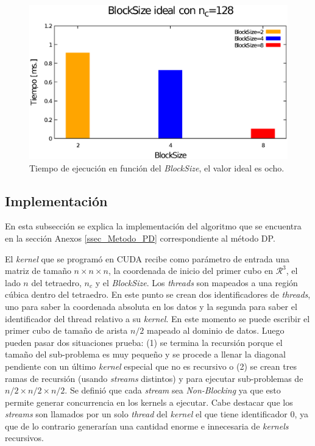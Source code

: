 \documentclass[10pt, conference, compsocconf, onecolumn]{IEEEtran}
\begin{document}
\begin{figure}[H]
	\centering
	\includegraphics[scale=0.45]{figures/BSideal.eps}
	\caption{Tiempo de ejecuci\'on en funci\'on del \textit{BlockSize}, el valor ideal es ocho.}
	\label{fig_Block_size_i}
\end{figure}

\subsection{Implementaci\'on}

En esta subsecci\'on se explica la implementaci\'on del algoritmo que se encuentra en la secci\'on Anexos \ref{ssec_Metodo_PD} correspondiente al m\'etodo DP.

El \textit{kernel} que se program\'o en CUDA recibe como par\'ametro de entrada una matriz de tama\~no $n\times n \times n$, la coordenada de inicio del primer cubo en $\mathcal{R}^3$, el lado $n$ del tetraedro, $n_{c}$ y el \textit{BlockSize}. Los \textit{threads} son mapeados a una regi\'on c\'ubica dentro del tetraedro. En este punto se crean dos identificadores de \textit{threads}, uno para saber la coordenada absoluta en los datos y la segunda para saber el identificador del thread relativo a su \textit{kernel}. En este momento se puede escribir el primer cubo de tama\~no de arista $n/2$ mapeado al dominio de datos. Luego pueden pasar dos situaciones prueba: (1) se termina la recursi\'on porque el tama\~no del sub-problema es muy peque\~no y se procede a llenar la diagonal  pendiente con un \'ultimo \textit{kernel} especial que no es recursivo o (2) se crean tres ramas de recursi\'on (usando \textit{streams} distintos) y para ejecutar sub-problemas de $n/2\times n/2 \times n/2$. Se defini\'o que cada \textit{stream} sea \textit{Non-Blocking} ya que esto permite generar concurrencia en los kernels a ejecutar. Cabe destacar que los \textit{streams} son llamados por un solo \textit{thread} del \textit{kernel} el que tiene identificador 0, ya que de lo contrario generar\'ian una cantidad enorme e innecesaria de \textit{kernels} recursivos. 
\end{document}

